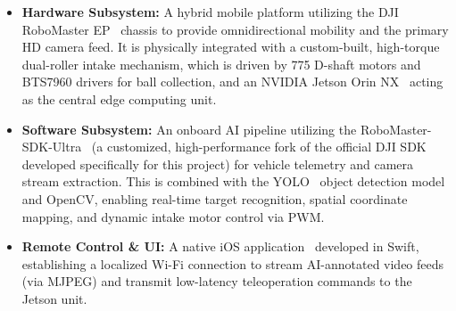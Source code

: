 \begin{itemize}
  \item \textbf{Hardware Subsystem:} A hybrid mobile platform utilizing the DJI RoboMaster EP~\cite{robomaster_ep} chassis to provide omnidirectional mobility and the primary HD camera feed. It is physically integrated with a custom-built, high-torque dual-roller intake mechanism, which is driven by 775 D-shaft motors and BTS7960 drivers for ball collection, and an NVIDIA Jetson Orin NX~\cite{jetson_orin} acting as the central edge computing unit.

  \item \textbf{Software Subsystem:} An onboard AI pipeline utilizing the RoboMaster-SDK-Ultra~\cite{robomaster_sdk_ultra} (a customized, high-performance fork of the official DJI SDK developed specifically for this project) for vehicle telemetry and camera stream extraction. This is combined with the YOLO~\cite{yolo26} object detection model and OpenCV, enabling real-time target recognition, spatial coordinate mapping, and dynamic intake motor control via PWM.
  \item \textbf{Remote Control \& UI:} A native iOS application~\cite{apple_doc} developed in Swift, establishing a localized Wi-Fi connection to stream AI-annotated video feeds (via MJPEG) and transmit low-latency teleoperation commands to the Jetson unit.
\end{itemize}


